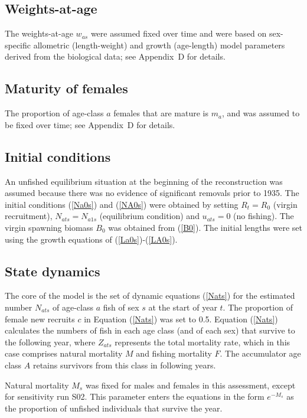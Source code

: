 \documentclass[11pt]{book}
\newcommand{\AppBio}{Appendix~D}
\newcommand{\eref}[1]{(\ref{#1})}
\begin{document}
\subsection{Weights-at-age}

The weights-at-age $w_{as}$ were assumed fixed over time and were based on sex-specific allometric (length-weight) and growth (age-length) model parameters derived from the biological data; see \AppBio{} for details.

\subsection{Maturity of females}

The proportion of age-class $a$ females that are mature is $m_a$, and was assumed to be fixed over time; see \AppBio{} for details.

\subsection{Initial conditions}

An unfished equilibrium situation at the beginning of the reconstruction was assumed because there was no evidence of significant removals prior to 1935.
The initial conditions \eref{Na0s} and \eref{NA0s} were obtained by setting $R_t = R_0$ (virgin recruitment), $N_{ats} = N_{a1s}$ (equilibrium condition) and $u_{ats} = 0$ (no fishing).
The virgin spawning biomass $B_0$ was obtained from \eref{B0}.
The initial lengths were set using the growth equations of \citet{Schnute:1981} \eref{La0s}-\eref{LA0s}.

\subsection{State dynamics}

The core of the model is the set of dynamic equations \eref{Nats} for the estimated number $N_{ats}$ of age-class $a$ fish of sex $s$ at the start of year $t$. 
The proportion of female new recruits $c$ in Equation \eref{Nats} was set to 0.5.
Equation \eref{Nats} calculates the numbers of fish in each age class (and of each sex) that survive to the following year, where $Z_{ats}$ represents the total mortality rate, which in this case comprises natural mortality $M$ and fishing mortality $F$. 
The accumulator age class $A$ retains survivors from this class in following years.

Natural mortality $M_s$ was fixed for males and females in this assessment, except for sensitivity run S02.
This parameter enters the equations in the form $e^{-M_s}$ as the proportion of unfished individuals that survive the year.
\end{document}
